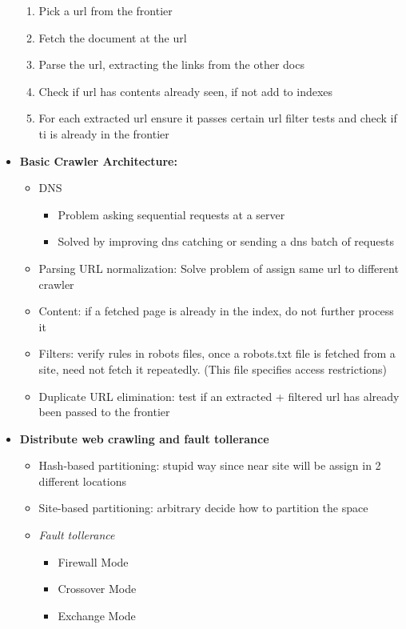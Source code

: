 \begin{itemize}
\begin{enumerate}
        \item Pick a url from the frontier
        \item Fetch the document at the url
        \item Parse the url, extracting the links from the other docs
        \item Check if url has contents already seen, if not add to indexes
        \item For each extracted url ensure it passes certain url filter tests and check if ti is already in the frontier
    \end{enumerate}
    \item \textbf{Basic Crawler Architecture:}
    \begin{itemize}
        \item DNS
        \begin{itemize}
            \item Problem asking sequential requests at a server
            \item Solved by improving dns catching or sending a dns batch of requests
        \end{itemize}
        \item Parsing URL normalization: Solve problem of assign same url to different crawler
        \item Content: if a fetched page is already in the index, do not further process it
        \item Filters: verify rules in robots files, once a robots.txt file is fetched from a site, need not fetch it repeatedly. (This file specifies access restrictions)
        \item Duplicate URL elimination: test if an extracted + filtered url has already been passed to the frontier
    \end{itemize}
    \item \textbf{Distribute web crawling and fault tollerance}
    \begin{itemize}
        \item Hash-based partitioning: stupid way since near site will be assign in 2 different locations
        \item Site-based partitioning: arbitrary decide how to partition the space
        \item \textit{Fault tollerance}
        \begin{itemize}
            \item Firewall Mode
            \item Crossover Mode
            \item Exchange Mode

\end{itemize}
\end{itemize}
\end{itemize}
